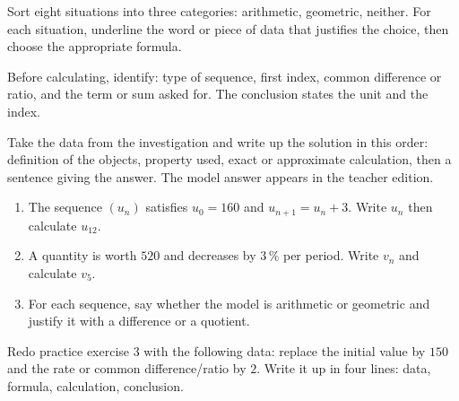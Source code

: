 \begin{activite}
Sort eight situations into three categories: arithmetic, geometric, neither. For each situation, underline the word or piece of data that justifies the choice, then choose the appropriate formula.

\end{activite}

\begin{traceecrite}Before calculating, identify: type of sequence, first index, common difference or ratio, and the term or sum asked for. The conclusion states the unit and the index.\end{traceecrite}

\begin{exemple}
Take the data from the investigation and write up the solution in this order: definition of the objects, property used, exact or approximate calculation, then a sentence giving the answer. The model answer appears in the teacher edition.
\end{exemple}

\begin{exercice}[-- essential]
\begin{enumerate}\item The sequence $(u_n)$ satisfies $u_0=160$ and $u_{n+1}=u_n+3$. Write $u_n$ then calculate $u_{12}$.\item A quantity is worth $520$ and decreases by $3\,\%$ per period. Write $v_n$ and calculate $v_5$.\item For each sequence, say whether the model is arithmetic or geometric and justify it with a difference or a quotient.\end{enumerate}
\end{exercice}


\begin{dm}Redo practice exercise 3 with the following data: replace the initial value by $150$ and the rate or common difference/ratio by $2$. Write it up in four lines: data, formula, calculation, conclusion.\end{dm}

